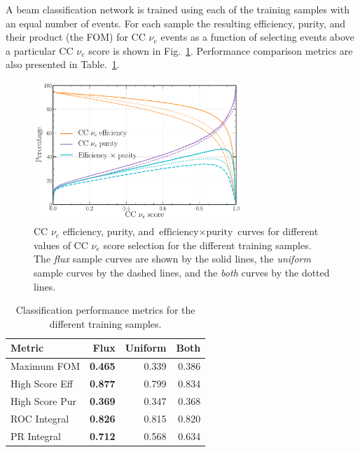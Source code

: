 A beam classification network is trained using each of the training samples with an equal number
of events. For each sample the resulting efficiency, purity, and their product (the FOM) for CC
$\nu_{e}$ events as a function of selecting events above a particular CC $\nu_{e}$ score is shown
in Fig.~\ref{fig:sample_nuel_eff_curves}. Performance comparison metrics are also presented in
Table.~\ref{tab:sample}.

\begin{figure} %
    \includegraphics[width=0.7\textwidth]{diagrams/7-results/sample_nuel_eff_curves.pdf}
    \caption[CC $\nu_{e}$ efficiency and purity curves for different training samples]
    {CC $\nu_{e}$ efficiency, purity, and $\text{efficiency}\times\text{purity}$ curves for
        different values of CC $\nu_{e}$ score selection for the different training samples. The
        \emph{flux} sample curves are shown by the solid lines, the \emph{uniform} sample curves
        by the dashed lines, and the \emph{both} curves by the dotted lines.}
    \label{fig:sample_nuel_eff_curves}
\end{figure}

\begin{table} %
    \begin{tabular}{lrrr}
        Metric         & Flux           & Uniform & Both  \\
        \midrule
        Maximum FOM    & \textbf{0.465} & 0.339   & 0.386 \\
        High Score Eff & \textbf{0.877} & 0.799   & 0.834 \\
        High Score Pur & \textbf{0.369} & 0.347   & 0.368 \\
        ROC Integral   & \textbf{0.826} & 0.815   & 0.820 \\
        PR Integral    & \textbf{0.712} & 0.568   & 0.634 \\
    \end{tabular}
    \caption[Classification performance metrics for different training samples]
    {Classification performance metrics for the different training samples.}
    \label{tab:sample}
\end{table}

